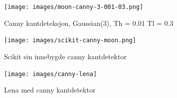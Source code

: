 \documentclass[a4paper, 12pt]{article}
\begin{document}
\begin{figure}[h]
  \centering
  \texttt{[image: images/moon-canny-3-001-03.png]}
  \caption{Canny kantdeteksjon, Gaussian(3), Th = 0.01 Tl = 0.3}
  \label{fig:canny-moon-3}
\end{figure}


\begin{figure}[h]
  \centering
  \texttt{[image: images/scikit-canny-moon.png]}
  \caption{Scikit sin innebygde canny kantdetektor}
  \label{fig:canny-moon-scikit}
\end{figure}


\begin{figure}[h]
  \centering
  \texttt{[image: images/canny-lena]}
  \caption{Lena med canny kantdetektor}
  \label{fig:canny-lena}
\end{figure}
\end{document}
